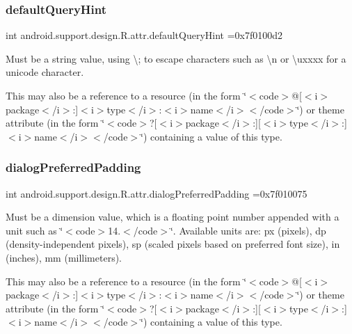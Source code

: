 \subsubsection{\texorpdfstring{default\+Query\+Hint}{defaultQueryHint}}
{\footnotesize\ttfamily int android.\+support.\+design.\+R.\+attr.\+default\+Query\+Hint =0x7f0100d2\hspace{0.3cm}{\ttfamily [static]}}

Must be a string value, using \textquotesingle{}\textbackslash{};\textquotesingle{} to escape characters such as \textquotesingle{}\textbackslash{}n\textquotesingle{} or \textquotesingle{}\textbackslash{}uxxxx\textquotesingle{} for a unicode character. 

This may also be a reference to a resource (in the form \char`\"{}$<$code$>$@\mbox{[}$<$i$>$package$<$/i$>$\+:\mbox{]}$<$i$>$type$<$/i$>$\+:$<$i$>$name$<$/i$>$$<$/code$>$\char`\"{}) or theme attribute (in the form \char`\"{}$<$code$>$?\mbox{[}$<$i$>$package$<$/i$>$\+:\mbox{]}\mbox{[}$<$i$>$type$<$/i$>$\+:\mbox{]}$<$i$>$name$<$/i$>$$<$/code$>$\char`\"{}) containing a value of this type. \mbox{\label{classandroid_1_1support_1_1design_1_1R_1_1attr_ae34cbd26b621f4e2f674c575d7722640}} 
\subsubsection{\texorpdfstring{dialog\+Preferred\+Padding}{dialogPreferredPadding}}
{\footnotesize\ttfamily int android.\+support.\+design.\+R.\+attr.\+dialog\+Preferred\+Padding =0x7f010075\hspace{0.3cm}{\ttfamily [static]}}

Must be a dimension value, which is a floating point number appended with a unit such as \char`\"{}$<$code$>$14.\+5sp$<$/code$>$\char`\"{}. Available units are\+: px (pixels), dp (density-\/independent pixels), sp (scaled pixels based on preferred font size), in (inches), mm (millimeters). 

This may also be a reference to a resource (in the form \char`\"{}$<$code$>$@\mbox{[}$<$i$>$package$<$/i$>$\+:\mbox{]}$<$i$>$type$<$/i$>$\+:$<$i$>$name$<$/i$>$$<$/code$>$\char`\"{}) or theme attribute (in the form \char`\"{}$<$code$>$?\mbox{[}$<$i$>$package$<$/i$>$\+:\mbox{]}\mbox{[}$<$i$>$type$<$/i$>$\+:\mbox{]}$<$i$>$name$<$/i$>$$<$/code$>$\char`\"{}) containing a value of this type. \mbox{\label{classandroid_1_1support_1_1design_1_1R_1_1attr_a9d4fd20161a17ac001044defe33997c6}} 
